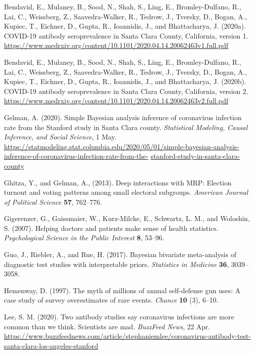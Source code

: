 \documentclass[11pt]{article}
\begin{document}
\noindent

\bibitem  Bendavid, E., Mulaney, B., Sood, N., Shah, S., Ling, E., Bromley-Dulfano, R., Lai, C.,  Weissberg, Z., Saavedra-Walker, R., Tedrow, J., Tversky, D., Bogan, A., Kupiec, T., Eichner, D., Gupta, R., Ioannidis, J., and Bhattacharya, J. (2020a).  COVID-19 antibody seroprevalence in Santa Clara County, California, version 1. \url{https://www.medrxiv.org/content/10.1101/2020.04.14.20062463v1.full.pdf}

\bibitem  Bendavid, E., Mulaney, B., Sood, N., Shah, S., Ling, E., Bromley-Dulfano, R., Lai, C.,  Weissberg, Z., Saavedra-Walker, R., Tedrow, J., Tversky, D., Bogan, A., Kupiec, T., Eichner, D., Gupta, R., Ioannidis, J., and Bhattacharya, J. (2020b).  COVID-19 antibody seroprevalence in Santa Clara County, California, version 2. \url{https://www.medrxiv.org/content/10.1101/2020.04.14.20062463v2.full.pdf}

\bibitem Gelman, A. (2020).  Simple Bayesian analysis inference of coronavirus infection rate from the Stanford study in Santa Clara county. {\em Statistical Modeling, Causal Inference, and Social Science}, 1 May.  \url{https://statmodeling.stat.columbia.edu/2020/05/01/simple-bayesian-analysis-inference-of-coronavirus-infection-rate-from-the-} \url{stanford-study-in-santa-clara-county}

\bibitem Ghitza, Y., and Gelman, A., (2013). Deep interactions with MRP: Election turnout and voting patterns among small electoral subgroups. {\em American Journal of Political Science} {\bf 57}, 762--776.

\bibitem Gigerenzer, G., Gaissmaier, W., Kurz-Milcke, E., Schwartz, L. M., and Woloshin, S.  (2007).  Helping doctors and patients make sense of health statistics.  {\em Psychological Science in the Public Interest} {\bf 8}, 53--96.

\bibitem Guo, J., Riebler, A., and Rue, H. (2017).  Bayesian bivariate meta-analysis of diagnostic test studies with interpretable priors.  {\em Statistics in Medicine} {\bf 36}, 3039--3058.

\bibitem Hemenway, D. (1997).  The myth of millions of annual self-defense gun uses:  A case study of survey overestimates of rare events.  {\em Chance} {\bf 10} (3), 6--10.

\bibitem Lee, S. M. (2020).  Two antibody studies say coronavirus infections are more common than we think. Scientists are mad.  {\em BuzzFeed News}, 22 Apr.  \url{https://www.buzzfeednews.com/article/stephaniemlee/coronavirus-antibody-test-santa-clara-los-angeles-stanford}
\end{document}
